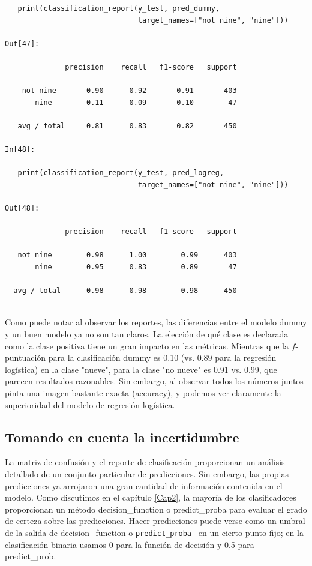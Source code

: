 {\begin{lstlisting}
   print(classification_report(y_test, pred_dummy,
                               target_names=["not nine", "nine"]))

Out[47]:

              precision    recall   f1-score   support
      
    not nine       0.90      0.92       0.91       403
       nine        0.11      0.09       0.10        47

   avg / total     0.81      0.83       0.82       450 

In[48]:

   print(classification_report(y_test, pred_logreg,
                               target_names=["not nine", "nine"]))

Out[48]:

              precision    recall   f1-score   support

   not nine        0.98      1.00        0.99      403
       nine        0.95      0.83        0.89       47

  avg / total      0.98      0.98        0.98      450


\end{lstlisting}

Como puede notar al observar los reportes, las diferencias entre el modelo dummy
y un buen modelo ya no son tan claros.  La elección de qué clase es declarada como la clase positiva tiene un gran impacto en las métricas.  Mientras que la $f$-puntuación para la clasificación dummy es 0.10  (vs. 0.89 para la regresión logística) en la clase "{}nueve"{}, para la clase "{}no nueve"{}  es 0.91 vs. 0.99, que parecen resultados razonables.  Sin embargo, al observar todos los números juntos pinta una imagen bastante exacta (accuracy), y podemos ver claramente la superioridad del modelo de regresión logística.

\subsection{Tomando en cuenta la incertidumbre}

La matriz de confusión y el reporte de clasificación proporcionan un análisis  detallado de
un conjunto particular de predicciones. Sin embargo,  las propias predicciones  ya arrojaron
una gran cantidad de información contenida en el modelo.   Como discutimos en el capítulo \ref{Cap2}, la mayoría de los clasificadores proporcionan un método  {\ttfamily decision\_function}  o  {\ttfamily predict\_proba }  para  evaluar el grado de certeza sobre las predicciones.  Hacer predicciones puede verse como un  umbral de la salida de {\ttfamily decision\_function}  o  {\tt predict\_proba }  en un cierto punto fijo; en la clasificación binaria usamos 0  para la función de decisión y  0.5  para  {\ttfamily predict\_prob}.\\

}
